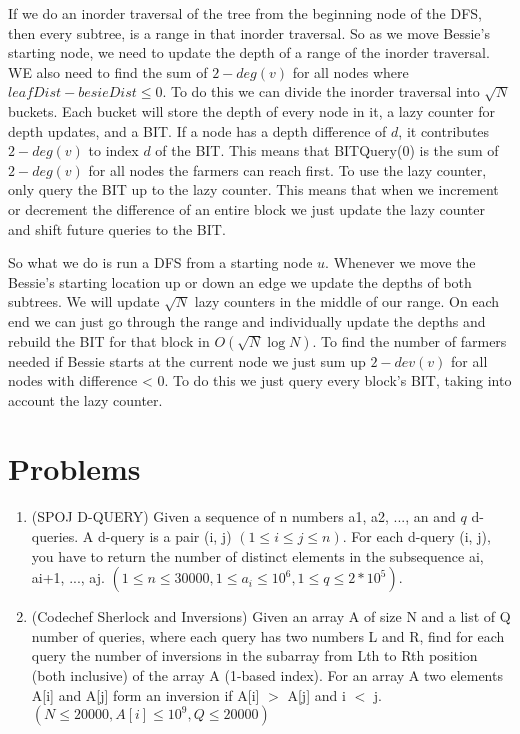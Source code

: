 \documentclass[11pt]{article}
\begin{document}
If we do an inorder traversal of the tree from the beginning node of the DFS, then every subtree, is a range in that inorder traversal.  So as we move Bessie's starting node, we need to update the depth of a range of the inorder traversal.  WE also need to find the sum of $2-deg(v)$ for all nodes where $leafDist-besieDist\leq 0$.  To do this we can divide the inorder traversal into $\sqrt{N}$ buckets.  Each bucket will store the depth of every node in it, a lazy counter for depth updates, and a BIT.  If a node has a depth difference of $d$, it contributes $2-deg(v)$ to index $d$ of the BIT.  This means that BITQuery(0) is the sum of $2-deg(v)$ for all nodes the farmers can reach first.  To use the lazy counter, only query the BIT up to the lazy counter.  This means that when we increment or decrement the difference of an entire block we just update the lazy counter and shift future queries to the BIT.

So what we do is run a DFS from a starting node $u$.  Whenever we move the Bessie's starting location up or down an edge we update the depths of both subtrees.  We will update $\sqrt{N}$ lazy counters in the middle of our range.  On each end we can just go through the range and individually update the depths and rebuild the BIT for that block in $O(\sqrt{N}\log N)$.  To find the number of farmers needed if Bessie starts at the current node we just sum up $2-dev(v)$ for all nodes with difference < 0.  To do this we just query every block's BIT, taking into account the lazy counter.

\section{Problems}
\begin{enumerate}
    \item (SPOJ D-QUERY) Given a sequence of n numbers a1, a2, ..., an and $q$ d-queries. A d-query is a pair (i, j) $(1 \leq i \leq j \leq n)$. For each d-query (i, j), you have to return the number of distinct elements in the subsequence ai, ai+1, ..., aj. $(1 \leq n \leq 30000, 1 \leq a_i \leq 10^6, 1 \leq q \leq 2*10^5)$.
    
    \item (Codechef Sherlock and Inversions) Given an array A of size N and a list of Q number of queries, where each query has two numbers L and R, find for each query the number of inversions in the subarray from Lth to Rth position (both inclusive) of the array A (1-based index).
    For an array A two elements A[i] and A[j] form an inversion if A[i] $>$ A[j] and i $<$ j. $(N \leq 20000, A[i] \leq 10^9, Q \leq 20000)$
\end{enumerate}
\end{document}
